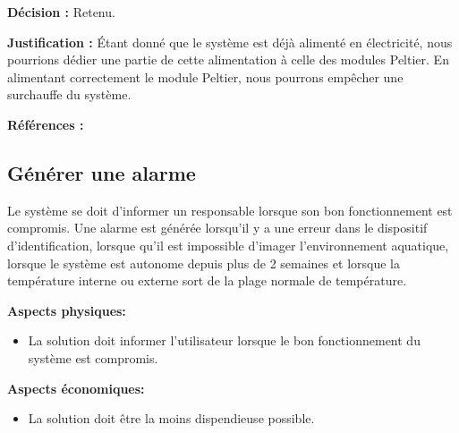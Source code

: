 \textbf{Décision :} Retenu.

\textbf{Justification :} Étant donné que le système est déjà alimenté en électricité, nous pourrions dédier une partie de cette alimentation à celle des modules Peltier. En alimentant correctement le module Peltier, nous pourrons empêcher une surchauffe du système.

\textbf{Références :} \cite{pel1} \cite{pel2}

\begin{table}[!htb]
\footnotesize
\centering
{}
\caption{Faisabilité des concepts pour réguler la température}
\label{t:Decision_réguler}
\end{table}


\subsection{Générer une alarme}
Le système se doit d'informer un responsable lorsque son bon fonctionnement est compromis. Une alarme est générée lorsqu'il y a une erreur dans le dispositif d'identification, lorsque qu'il est impossible d'imager l'environnement aquatique, lorsque le système est autonome depuis plus de 2 semaines et lorsque la température interne ou externe sort de la plage normale de température.


\textbf{Aspects physiques:}
\begin{itemize}[label = {--}]
    \item La solution doit informer l'utilisateur lorsque le bon fonctionnement du système est compromis.
\end{itemize}

\textbf{Aspects économiques:}
\begin{itemize}[label = {--}]
    \item La solution doit être la moins dispendieuse possible.
\end{itemize}

